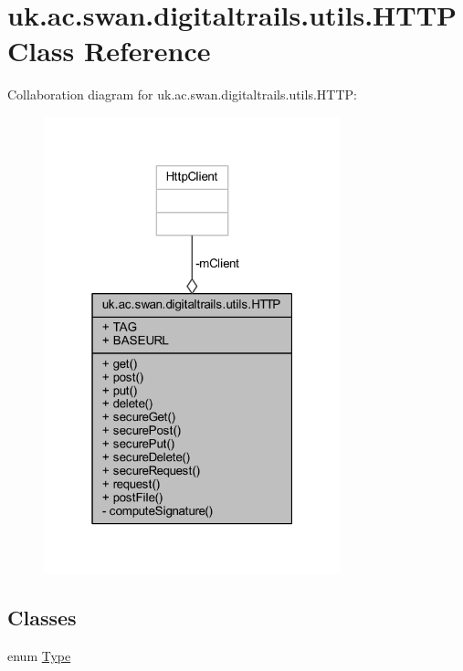 \hypertarget{classuk_1_1ac_1_1swan_1_1digitaltrails_1_1utils_1_1_h_t_t_p}{\section{uk.\+ac.\+swan.\+digitaltrails.\+utils.\+H\+T\+T\+P Class Reference}
\label{classuk_1_1ac_1_1swan_1_1digitaltrails_1_1utils_1_1_h_t_t_p}
}


Collaboration diagram for uk.\+ac.\+swan.\+digitaltrails.\+utils.\+H\+T\+T\+P\+:
\nopagebreak
\begin{figure}[H]
\begin{center}
\leavevmode
\includegraphics[width=244pt]{classuk_1_1ac_1_1swan_1_1digitaltrails_1_1utils_1_1_h_t_t_p__coll__graph}
\end{center}
\end{figure}
\subsection*{Classes}
\begin{DoxyCompactItemize}
\item 
enum \hyperlink{enumuk_1_1ac_1_1swan_1_1digitaltrails_1_1utils_1_1_h_t_t_p_1_1_type}{Type}
\end{DoxyCompactItemize}
